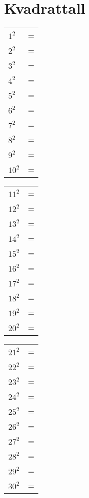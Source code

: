 \documentclass[11pt]{article}
\begin{document}
\section*{Kvadrattall}
\begin{multicols}{3}
\small
\begin{tabular}{@{}lr@{}}
$1^2$  &= \\
$2^2$  &= \\
$3^2$  &= \\
$4^2$  &= \\
$5^2$  &= \\
$6^2$  &= \\
$7^2$  &= \\
$8^2$  &= \\
$9^2$  &= \\
$10^2$ &= \\
\end{tabular}

\columnbreak
\begin{tabular}{@{}lr@{}}
$11^2$ &= \\
$12^2$ &= \\
$13^2$ &= \\
$14^2$ &= \\
$15^2$ &= \\
$16^2$ &= \\
$17^2$ &= \\
$18^2$ &= \\
$19^2$ &= \\
$20^2$ &= \\
\end{tabular}

\columnbreak
\begin{tabular}{@{}lr@{}}
$21^2$ &= \\
$22^2$ &= \\
$23^2$ &= \\
$24^2$ &= \\
$25^2$ &= \\
$26^2$ &= \\
$27^2$ &= \\
$28^2$ &= \\
$29^2$ &= \\
$30^2$ &= \\
\end{tabular}
\end{multicols}

\end{document}
